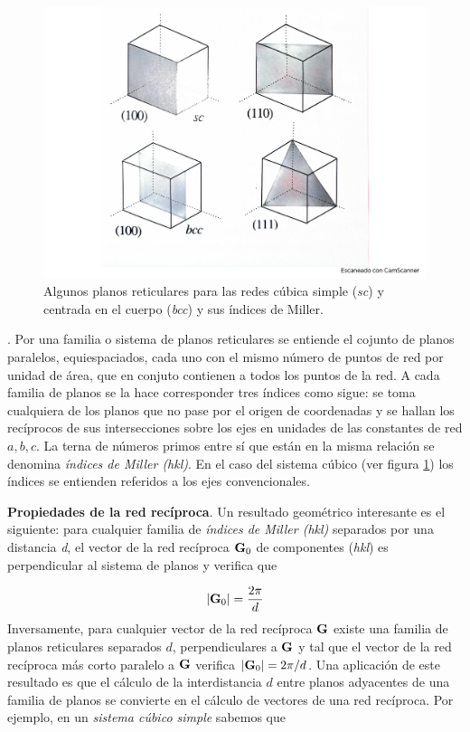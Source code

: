 \begin{figure}[h!] \centering
\includegraphics[scale=0.40]{Cuerpo/Ch_02/Fotos_libro 1.pdf}
\caption{Algunos planos reticulares para las redes cúbica simple (\textit{sc}) y centrada en el cuerpo (\textit{bcc}) y sus índices de Miller.}
\label{Fig:02-01}
\end{figure}

\begin{definition}. Por una familia o sistema de planos reticulares se entiende el cojunto de planos paralelos, equiespaciados, cada uno con el mismo número de puntos de red por unidad de área, que en conjuto contienen a todos los puntos de la red. A cada familia de planos se la hace corresponder tres índices como sigue: se toma cualquiera de los planos que no pase por el origen de coordenadas y se hallan los recíprocos de sus intersecciones sobre los ejes en unidades de las constantes de red $a,b,c$. La terna de números primos entre sí que están en la misma relación se denomina \textit{índices de Miller (hkl)}. En el caso del sistema cúbico (ver figura \ref{Fig:02-01}) los índices se entienden referidos a los ejes convencionales.    
\end{definition}


\textbf{Propiedades de la red recíproca}. Un resultado  geométrico interesante es el siguiente: para cualquier familia de \textit{índices de Miller (hkl)} separados por una distancia \textit{d}, el vector de la red recíproca $\mathbf{G}_0$ de componentes (\textit{hkl}) es perpendicular al sistema de planos y verifica que

\begin{equation}
|\mathbf{G}_0| = \frac{2\pi}{d} \label{Ec:02-01-05}
\end{equation}
Inversamente, para cualquier vector de la red recíproca $\mathbf{G}$ existe una familia de planos reticulares separados $d$, perpendiculares a $\mathbf{G}$ y tal que el vector de la red recíproca más corto paralelo a $\mathbf{G}$ verifica $|\mathbf{G}_0|=2\pi/d$. Una aplicación de este resultado es que el cálculo de la interdistancia $d$ entre planos adyacentes de una familia de planos se convierte en el cálculo de vectores de una red recíproca. Por ejemplo, en un \textit{sistema cúbico simple} sabemos que 

